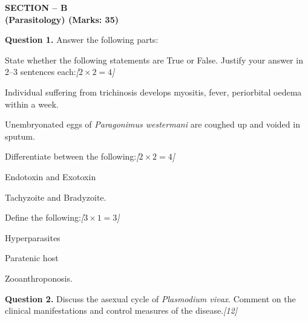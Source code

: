 \documentclass[11pt,a4paper]{article}
\newcommand{\pts}[1]{\hfill   \textit{[#1]}}
\begin{document}
\bigskip

\begin{center}
   \textbf{SECTION -- B} \\
   \textbf{(Parasitology) (Marks: 35)}
\end{center}




\noindent   \textbf{Question 1.} Answer the following parts:

\begin{parts}
  \item State whether the following statements are True or False. Justify your answer in 2--3 sentences each:\pts{$2  \times 2 = 4$}
  
\begin{parts}
    \item Individual suffering from trichinosis develops myositis, fever, periorbital oedema within a week.
    \item Unembryonated eggs of   \textit{Paragonimus westermani} are coughed up and voided in sputum.
  \end{parts}
  
  \item Differentiate between the following:\pts{$2  \times 2 = 4$}
  
\begin{parts}
    \item Endotoxin and Exotoxin
    \item Tachyzoite and Bradyzoite.
  \end{parts}
  
  \item Define the following:\pts{$3  \times 1 = 3$}
  
\begin{parts}
    \item Hyperparasites
    \item Paratenic host
    \item Zooanthroponosis.
  \end{parts}
\end{parts}

\pagebreak

\medskip


\noindent   \textbf{Question 2.} Discuss the asexual cycle of   \textit{Plasmodium vivax}. Comment on the clinical manifestations and control measures of the disease.\pts{12}
\end{document}
